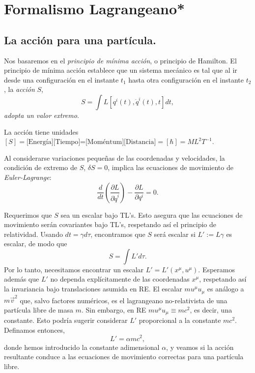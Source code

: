 \section{Formalismo Lagrangeano*}
\subsection{La acción para una partícula.}
Nos basaremos en el \emph{principio de mínima acción}, o
principio de Hamilton. El principio de mínima acción
establece que un sistema mecánico es tal que al ir desde una
configuración en el instante $t_1$ hasta otra configuración en el instante
$t_2$, la \textit{acción} $S$,
\begin{equation}
S=\int L\left[  q^i(t),\dot{q}^i(t)  ,t\right]  dt, \label{Sdt}
\end{equation}
\textit{adopta un valor extremo}.

La acción tiene unidades $\left[  S\right]  = \text{[Energía][Tiempo]=[Moméntum][Distancia]}=[\hbar]=ML^2T^{-1}$.

Al considerarse variaciones pequeñas de las coordenadas y
velocidades, la condición de extremo de $S$, $\delta S=0$, implica las
ecuaciones de movimiento de \textit{Euler-Lagrange}:
\begin{equation}
\frac{d}{dt}\left(  \frac{\partial L}{\partial\dot{q}^i}\right)
-\frac{\partial L}{\partial q^i}=0.\label{L-euler}
\end{equation}

Requerimos que $S$ sea un escalar bajo TL's. Esto asegura que las ecuaciones de
movimiento serán covariantes bajo TL's, respetando así el principio de
relatividad. Usando $dt=\gamma d\tau$, encontramos que $S$ será escalar si
$L':=L\gamma$ es escalar, de modo que
\begin{equation}
S=\int L' d\tau.
\end{equation}
Por lo tanto, necesitamos encontrar un escalar $L'=L'(x^\mu,u^\mu)$. Esperamos
además que $L'$ no dependa explícitamente de las coordenadas $x^\mu$,
respetando así la invariancia bajo translaciones asumida en RE. El escalar $m u^\mu u_\mu$  es análogo a $m\vec{v}^2$  que, salvo factores
numéricos, es el lagrangeano no-relativista de una partícula libre de masa $m$. Sin embargo, en RE $m u^\mu u_\mu\equiv mc^2$, es decir, una constante. Esto podría sugerir considerar $L'$ proporcional a la constante $mc^2$. Definamos entonces,
\begin{equation}
L'=\alpha mc^2,
\end{equation}
donde hemos introducido la constante adimensional $\alpha$, y veamos si la acción resultante conduce a las ecuaciones de movimiento correctas para una partícula libre.

